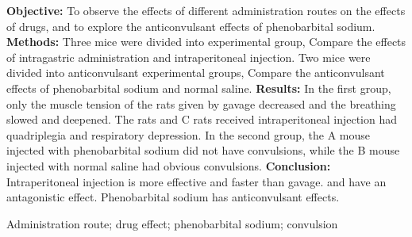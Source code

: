 \documentclass[lang=cn,11pt,a4paper,cite=super,AutoFakeBold,chinesefont=founder]{elegantpaper}
\newcommand{\enabs}{\noindent{\textbf{Abstract}\quad}}
\newcommand{\enkys}{\noindent{\textbf{Key Words}\quad}}
\begin{document}
\enabs
\textbf{Objective: }To observe the effects of different administration routes on the effects of drugs, and to explore the anticonvulsant effects of phenobarbital sodium. %
\textbf{Methods: }Three mice were divided into experimental group, Compare the effects of intragastric administration and intraperitoneal injection. Two mice were divided into anticonvulsant experimental groups, Compare the anticonvulsant effects of phenobarbital sodium and normal saline. %
\textbf{Results: }In the first group, only the muscle tension of the rats given by gavage decreased and the breathing slowed and deepened. The rats and C rats received intraperitoneal injection had quadriplegia and respiratory depression. In the second group, the A mouse injected with phenobarbital sodium did not have convulsions, while the B mouse injected with normal saline had obvious convulsions. %
\textbf{Conclusion: }Intraperitoneal injection is more effective and faster than gavage.  and  have an antagonistic effect. Phenobarbital sodium has anticonvulsant effects. %

\enkys
Administration route; drug effect; phenobarbital sodium; convulsion
\end{document}
